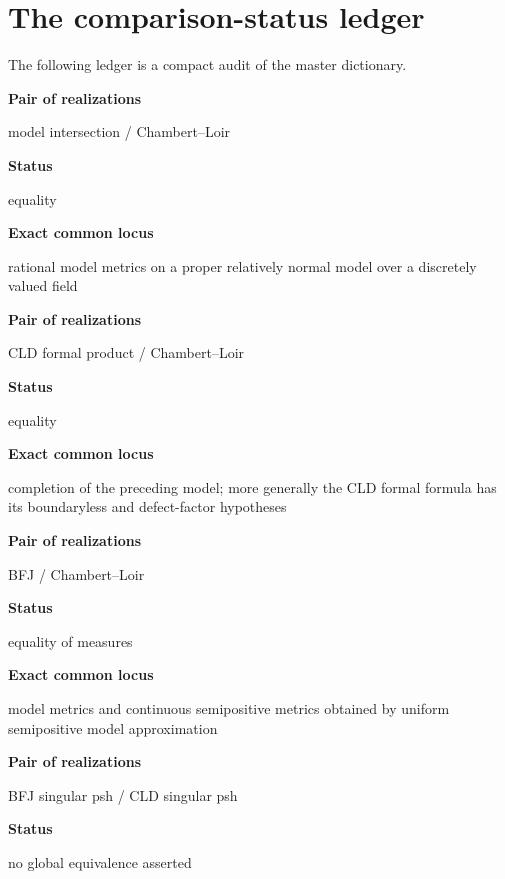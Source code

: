 \pagebreak
\section{The comparison-status ledger}
\label{sec:dict-status-ledger}

The following ledger is a compact audit of the master dictionary.

\begingroup
\setlength{\parindent}{0pt}

\textbf{Pair of realizations}\par\nopagebreak
model intersection / Chambert--Loir\par\nopagebreak

\textbf{Status}\par\nopagebreak
equality\par\nopagebreak

\textbf{Exact common locus}\par\nopagebreak
rational model metrics on a proper relatively normal model over a
discretely valued field

\medskip
\textbf{Pair of realizations}\par\nopagebreak
CLD formal product / Chambert--Loir\par\nopagebreak

\textbf{Status}\par\nopagebreak
equality\par\nopagebreak

\textbf{Exact common locus}\par\nopagebreak
completion of the preceding model; more generally the CLD formal formula
has its boundaryless and defect-factor hypotheses

\medskip
\textbf{Pair of realizations}\par\nopagebreak
BFJ / Chambert--Loir\par\nopagebreak

\textbf{Status}\par\nopagebreak
equality of measures\par\nopagebreak

\textbf{Exact common locus}\par\nopagebreak
model metrics and continuous semipositive metrics obtained by uniform
semipositive model approximation

\medskip
\textbf{Pair of realizations}\par\nopagebreak
BFJ singular psh / CLD singular psh\par\nopagebreak

\textbf{Status}\par\nopagebreak
no global equivalence asserted\par\nopagebreak

